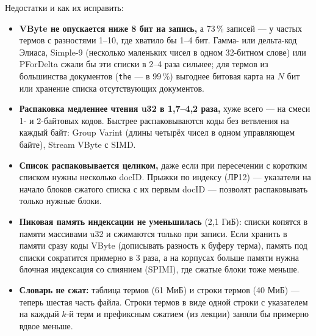 Недостатки и как их исправить:
\begin{itemize}
    \item \textbf{VByte не опускается ниже 8 бит на запись,} а 73\,\% записей --- у частых термов с разностями 1--10, где хватило бы 1--4 бит. Гамма- или дельта-код Элиаса, Simple-9 (несколько маленьких чисел в одном 32-битном слове) или PForDelta сжали бы эти списки в 2--4 раза сильнее; для термов из большинства документов (\texttt{the} --- в 99\,\%) выгоднее битовая карта на $N$ бит или хранение списка отсутствующих документов.
    \item \textbf{Распаковка медленнее чтения u32 в 1,7--4,2 раза,} хуже всего --- на смеси 1- и 2-байтовых кодов. Быстрее распаковываются коды без ветвления на каждый байт: Group Varint (длины четырёх чисел в одном управляющем байте), Stream VByte с SIMD.
    \item \textbf{Список распаковывается целиком,} даже если при пересечении с коротким списком нужны несколько docID. Прыжки по индексу (ЛР12) --- указатели на начало блоков сжатого списка с их первым docID --- позволят распаковывать только нужные блоки.
    \item \textbf{Пиковая память индексации не уменьшилась} (2,1 ГиБ): списки копятся в памяти массивами u32 и сжимаются только при записи. Если хранить в памяти сразу коды VByte (дописывать разность к буферу терма), память под списки сократится примерно в 3 раза, а на корпусах больше памяти нужна блочная индексация со слиянием (SPIMI), где сжатые блоки тоже меньше.
    \item \textbf{Словарь не сжат:} таблица термов (61 МиБ) и строки термов (40 МиБ) --- теперь шестая часть файла. Строки термов в виде одной строки с указателем на каждый $k$-й терм и префиксным сжатием (из лекции) заняли бы примерно вдвое меньше.
\end{itemize}
